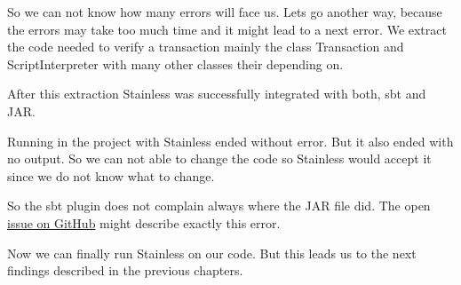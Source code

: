 So we can not know how many errors will face us.
Lets go another way, because the errors may take too much time and it might lead to a next error.
We extract the code needed to verify a transaction mainly the class Transaction and ScriptInterpreter with many other classes their depending on.

After this extraction Stainless was successfully integrated with both, sbt and JAR.

Running  in the project with Stainless ended without error.
But it also ended with no output.
So we can not able to change the code so Stainless would accept it since we do not know what to change.

So the sbt plugin does not complain always where the JAR file did.
The open \href{https://github.com/epfl-lara/stainless/issues/484}{issue  on GitHub} might describe exactly this error.

Now we can finally run Stainless on our code.
But this leads us to the next findings described in the previous chapters.
